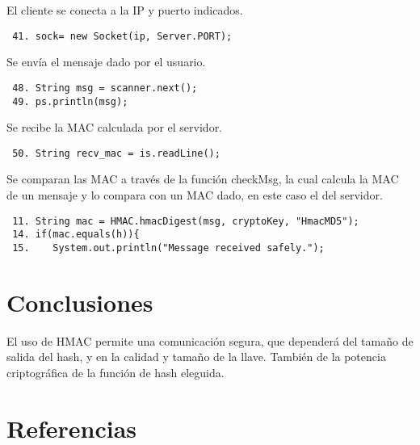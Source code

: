 \documentclass[letter, 10pt]{article}
\begin{document}
El cliente se conecta a la IP y puerto indicados.
\begin{verbatim}
 41. sock= new Socket(ip, Server.PORT);
\end{verbatim}
Se envía el mensaje dado por el usuario.
\begin{verbatim}
 48. String msg = scanner.next(); 
 49. ps.println(msg); 
\end{verbatim}
Se recibe la MAC calculada por el servidor.
\begin{verbatim}
 50. String recv_mac = is.readLine();  
\end{verbatim}
Se comparan las MAC a través de la función checkMsg, la cual calcula la MAC de un mensaje
y lo compara con un MAC dado, en este caso el del servidor.
\begin{verbatim}
 11. String mac = HMAC.hmacDigest(msg, cryptoKey, "HmacMD5");
 14. if(mac.equals(h)){                                 
 15.    System.out.println("Message received safely.");
\end{verbatim}

\newpage
\section{Conclusiones}
El uso de HMAC permite una comunicación segura, que dependerá del tamaño de salida del hash, y en la calidad
y tamaño de la llave. También de la potencia criptográfica de la función de hash eleguida. 

\section{Referencias}
\end{document}
